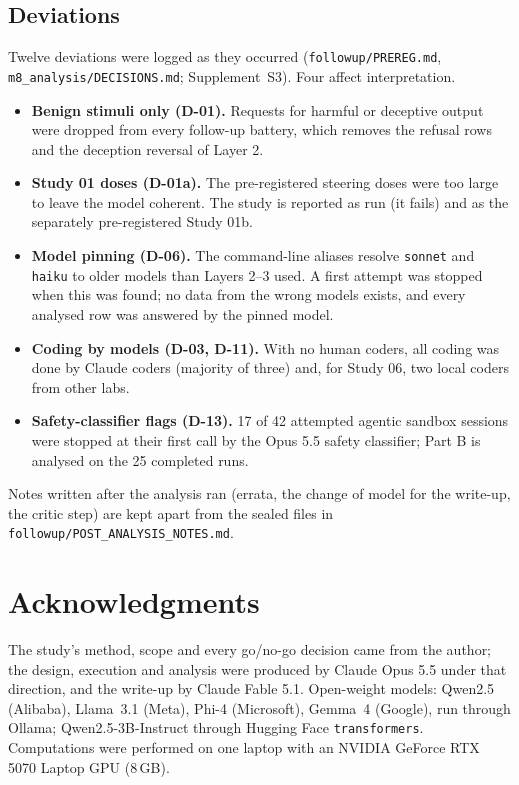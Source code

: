 \documentclass[11pt]{article}
\begin{document}
\subsection{Deviations}

Twelve deviations were logged as they occurred (\texttt{followup/PREREG.md}, \texttt{m8\_analysis/DECISIONS.md};
Supplement~S3). Four affect interpretation.
\begin{itemize}
\item \textbf{Benign stimuli only (D-01).} Requests for harmful or deceptive output were dropped from every
  follow-up battery, which removes the refusal rows and the deception reversal of Layer 2.
\item \textbf{Study 01 doses (D-01a).} The pre-registered steering doses were too large to leave the model coherent.
  The study is reported as run (it fails) and as the separately pre-registered Study 01b.
\item \textbf{Model pinning (D-06).} The command-line aliases resolve \texttt{sonnet} and \texttt{haiku} to older
  models than Layers 2--3 used. A first attempt was stopped when this was found; no data from the wrong models
  exists, and every analysed row was answered by the pinned model.
\item \textbf{Coding by models (D-03, D-11).} With no human coders, all coding was done by Claude coders (majority of
  three) and, for Study 06, two local coders from other labs.
\item \textbf{Safety-classifier flags (D-13).} 17 of 42 attempted agentic sandbox sessions were stopped at their first
  call by the Opus 5.5 safety classifier; Part B is analysed on the 25 completed runs.
\end{itemize}
Notes written after the analysis ran (errata, the change of model for the write-up, the critic step) are kept apart
from the sealed files in \texttt{followup/POST\_ANALYSIS\_NOTES.md}.



\section*{Acknowledgments}

The study's method, scope and every go/no-go decision came from the author; the design, execution and analysis were
produced by Claude Opus 5.5 under that direction, and the write-up by Claude Fable 5.1. Open-weight models: Qwen2.5 (Alibaba), Llama~3.1 (Meta),
Phi-4 (Microsoft), Gemma~4 (Google), run through Ollama; Qwen2.5-3B-Instruct through Hugging Face
\texttt{transformers}. Computations were performed on one laptop with an NVIDIA GeForce RTX 5070 Laptop GPU (8\,GB).
\end{document}
